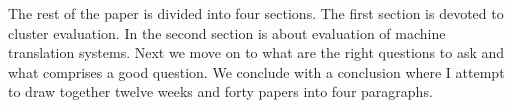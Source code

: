 \documentclass[11pt]{article}
\begin{document}
The rest of the paper is divided into four sections. 
The first section is devoted to cluster evaluation.
In the second section is about evaluation of 
machine translation systems. 
Next we move on to what are the right questions to ask and what comprises a good question. 
We conclude with a conclusion where I attempt to draw together twelve weeks and forty papers into four paragraphs.








\end{document}
